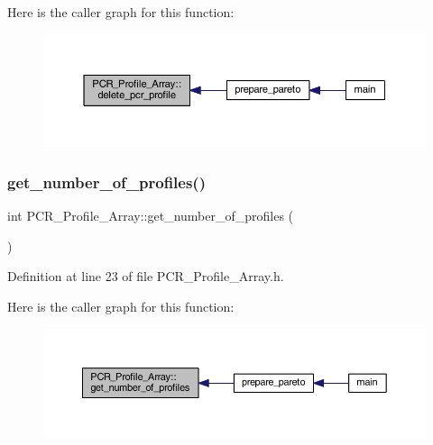 Here is the caller graph for this function\+:
\nopagebreak
\begin{figure}[H]
\begin{center}
\leavevmode
\includegraphics[width=350pt]{class_p_c_r___profile___array_a4b1ef7c1dad3c7bd8705e742b3c7eae5_icgraph}
\end{center}
\end{figure}
\mbox{\label{class_p_c_r___profile___array_ac135890d8866e94c20794012f38b58ab}} 
\subsubsection{\texorpdfstring{get\+\_\+number\+\_\+of\+\_\+profiles()}{get\_number\_of\_profiles()}}
{\footnotesize\ttfamily int P\+C\+R\+\_\+\+Profile\+\_\+\+Array\+::get\+\_\+number\+\_\+of\+\_\+profiles (\begin{DoxyParamCaption}{ }\end{DoxyParamCaption})\hspace{0.3cm}{\ttfamily [inline]}}



Definition at line 23 of file P\+C\+R\+\_\+\+Profile\+\_\+\+Array.\+h.

Here is the caller graph for this function\+:
\nopagebreak
\begin{figure}[H]
\begin{center}
\leavevmode
\includegraphics[width=350pt]{class_p_c_r___profile___array_ac135890d8866e94c20794012f38b58ab_icgraph}
\end{center}
\end{figure}
\mbox{\label{class_p_c_r___profile___array_ac17c28f26c27e61b6a6fd4189a4a2201}} 
